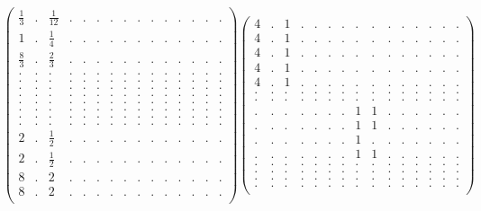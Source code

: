 \documentclass[12pt,a4paper]{amsart}
\begin{document}
\begin{align*}
\left(\begin{array}{rrrrrrrrrrrrrrr}%
\frac13&.&\frac{1}{12}&.&.&.&.&.&.&.&.&.&.&.&.\\%
1&.&\frac14&.&.&.&.&.&.&.&.&.&.&.&.\\%
\frac{8}{3}&.&\frac23&.&.&.&.&.&.&.&.&.&.&.&.\\%
.&.&.&.&.&.&.&.&.&.&.&.&.&.&.\\%
.&.&.&.&.&.&.&.&.&.&.&.&.&.&.\\%
.&.&.&.&.&.&.&.&.&.&.&.&.&.&.\\%
.&.&.&.&.&.&.&.&.&.&.&.&.&.&.\\%
.&.&.&.&.&.&.&.&.&.&.&.&.&.&.\\%
.&.&.&.&.&.&.&.&.&.&.&.&.&.&.\\%
.&.&.&.&.&.&.&.&.&.&.&.&.&.&.\\%
.&.&.&.&.&.&.&.&.&.&.&.&.&.&.\\%
2&.&\frac12&.&.&.&.&.&.&.&.&.&.&.&.\\%
2&.&\frac12&.&.&.&.&.&.&.&.&.&.&.&.\\%
8&.&2&.&.&.&.&.&.&.&.&.&.&.&.\\%
8&.&2&.&.&.&.&.&.&.&.&.&.&.&.\\%
\end{array}\right)%
\left(\begin{array}{rrrrrrrrrrrrrrr}%
4&.&1&.&.&.&.&.&.&.&.&.&.&.&.\\%
4&.&1&.&.&.&.&.&.&.&.&.&.&.&.\\%
4&.&1&.&.&.&.&.&.&.&.&.&.&.&.\\%
4&.&1&.&.&.&.&.&.&.&.&.&.&.&.\\%
4&.&1&.&.&.&.&.&.&.&.&.&.&.&.\\%
.&.&.&.&.&.&.&.&.&.&.&.&.&.&.\\%
.&.&.&.&.&.&.&.&.&.&.&.&.&.&.\\%
.&.&.&.&.&.&.&1&1&.&.&.&.&.&.\\%
.&.&.&.&.&.&.&1&1&.&.&.&.&.&.\\%
.&.&.&.&.&.&.&1&.&.&.&.&.&.&.\\%
.&.&.&.&.&.&.&1&1&.&.&.&.&.&.\\%
.&.&.&.&.&.&.&.&.&.&.&.&.&.&.\\%
.&.&.&.&.&.&.&.&.&.&.&.&.&.&.\\%
.&.&.&.&.&.&.&.&.&.&.&.&.&.&.\\%
.&.&.&.&.&.&.&.&.&.&.&.&.&.&.\\%
\end{array}\right)%
\end{align*}
\end{document}
